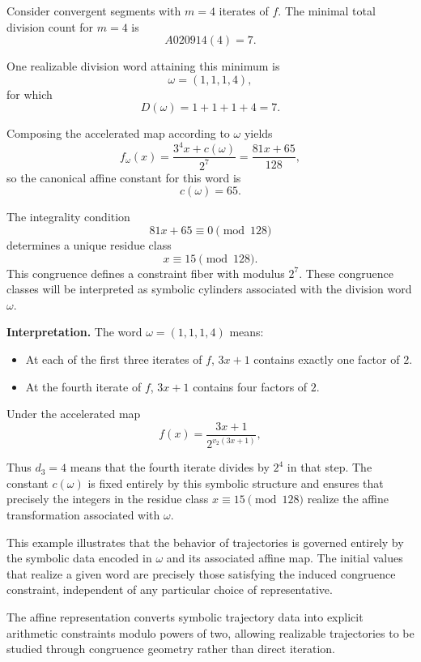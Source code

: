 \documentclass[12pt, oneside]{article}
\numberwithin{equation}{section}
\theoremstyle{definition}
\theoremstyle{plain}
\theoremstyle{remark}
\begin{document}
Consider convergent segments with $m=4$ iterates of $f$.  
The minimal total division count for $m=4$ is
\[
A020914(4) = 7.
\]

One realizable division word attaining this minimum is
\[
\omega = (1,1,1,4),
\]
for which
\[
D(\omega) = 1+1+1+4 = 7.
\]

Composing the accelerated map according to $\omega$ yields
\[
f_\omega(x)=\frac{3^4 x + c(\omega)}{2^7}
           = \frac{81x + 65}{128},
\]
so the canonical affine constant for this word is
\[
c(\omega)=65.
\]

The integrality condition
\[
81x + 65 \equiv 0 \pmod{128}
\]
determines a unique residue class
\[
x \equiv 15 \pmod{128}.
\]
This congruence defines a constraint fiber with modulus $2^7$.
These congruence classes will be interpreted as symbolic cylinders
associated with the division word \(\omega\).

\medskip

\noindent
\textbf{Interpretation.}
The word $\omega = (1,1,1,4)$ means:

\begin{itemize}
    \item At each of the first three iterates of $f$, $3x+1$ contains exactly one factor of $2$.
    \item At the fourth iterate of $f$, $3x+1$ contains four factors of $2$.
\end{itemize}

Under the accelerated map
\[
f(x)=\frac{3x+1}{2^{v_2(3x+1)}},
\]

Thus $d_3=4$ means that the fourth iterate divides by $2^4$ in that step.
The constant $c(\omega)$ is fixed entirely by this symbolic structure and
ensures that precisely the integers in the residue class $x \equiv 15 \pmod{128}$
realize the affine transformation associated with $\omega$.

This example illustrates that the behavior of trajectories is governed
entirely by the symbolic data encoded in $\omega$ and its associated
affine map. The initial values that realize a given word are precisely
those satisfying the induced congruence constraint, independent of any
particular choice of representative.

The affine representation converts symbolic trajectory data into explicit
arithmetic constraints modulo powers of two, allowing realizable trajectories
to be studied through congruence geometry rather than direct iteration.

\medskip
\end{document}
